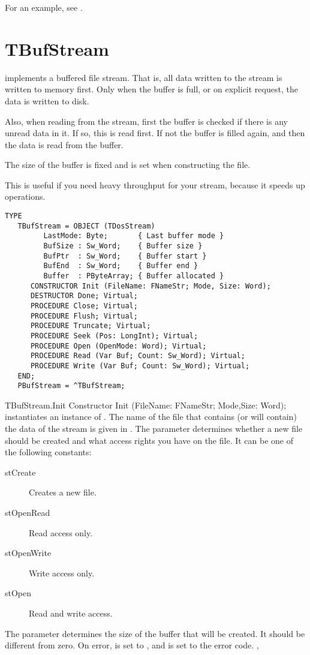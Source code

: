 For an example, see .

\section{TBufStream}
\label{se:TBufStream}

 implements a buffered file stream. That is, all data written
to the stream is written to memory first. Only when the buffer is full, or
on explicit request, the data is written to disk.

Also, when reading from the stream, first the buffer is checked if there is
any unread data in it. If so, this is read first. If not the buffer is
filled again, and then the data is read from the buffer.

The size of the buffer is fixed and is set when constructing the file.

This is useful if you need heavy throughput for your stream, because it
speeds up operations.

\begin{verbatim}
TYPE
   TBufStream = OBJECT (TDosStream)
         LastMode: Byte;       { Last buffer mode }
         BufSize : Sw_Word;    { Buffer size }
         BufPtr  : Sw_Word;    { Buffer start }
         BufEnd  : Sw_Word;    { Buffer end }
         Buffer  : PByteArray; { Buffer allocated }
      CONSTRUCTOR Init (FileName: FNameStr; Mode, Size: Word);
      DESTRUCTOR Done; Virtual;
      PROCEDURE Close; Virtual;
      PROCEDURE Flush; Virtual;
      PROCEDURE Truncate; Virtual;
      PROCEDURE Seek (Pos: LongInt); Virtual;
      PROCEDURE Open (OpenMode: Word); Virtual;
      PROCEDURE Read (Var Buf; Count: Sw_Word); Virtual;
      PROCEDURE Write (Var Buf; Count: Sw_Word); Virtual;
   END;
   PBufStream = ^TBufStream;
\end{verbatim}

\begin{procedure}{TBufStream.Init}
\Declaration
Constructor Init (FileName: FNameStr; Mode,Size: Word);
\Description
{} instantiates an instance of . The name of the 
file that contains (or will contain) the data of the stream is given in
. The  parameter determines whether a new file 
should be created and what access rights you have on the file. 
It can be one of the following constants:
\begin{description}
\item[stCreate] Creates a new file.
\item[stOpenRead] Read access only.
\item[stOpenWrite] Write access only.
\item[stOpen] Read and write access.
\end{description}
The  parameter determines the size of the buffer that will be
created. It should be different from zero.
\Errors
On error,  is set to , and 
is set to the \dos error code.
\SeeAlso
{}, 
\end{procedure}

